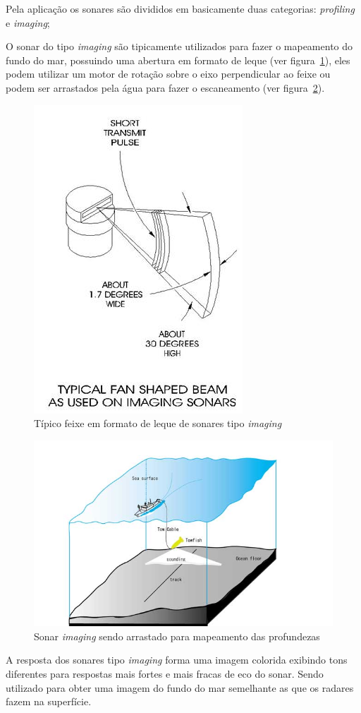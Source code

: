Pela aplicação os sonares são divididos em basicamente duas categorias: \emph{profiling} e \emph{imaging};

O sonar do tipo \emph{imaging} são tipicamente utilizados para fazer o mapeamento do fundo do mar, possuindo uma abertura em formato de leque (ver figura~\ref{sonar_1}), eles podem utilizar um motor de rotação sobre o eixo perpendicular ao feixe ou podem ser arrastados pela água para fazer o escaneamento (ver figura~\ref{sonar_2}).

\begin{figure}[H]
    \centering
    \includegraphics[width=0.5\columnwidth]{figs/sonar/1.jpg}
    \caption{Típico feixe em formato de leque de sonares tipo \emph{imaging}}
    \label{sonar_1}
\end{figure}

\begin{figure}[H]
    \centering
    \includegraphics[width=0.5\columnwidth]{figs/sonar/2.jpg}
    \caption{Sonar \emph{imaging} sendo arrastado para mapeamento das profundezas}
    \label{sonar_2}
\end{figure}


A resposta dos sonares tipo \emph{imaging} forma uma imagem colorida exibindo tons diferentes para respostas mais fortes e mais fracas de eco do sonar. Sendo utilizado para obter uma imagem do fundo do mar semelhante as que os radares fazem na superfície.

